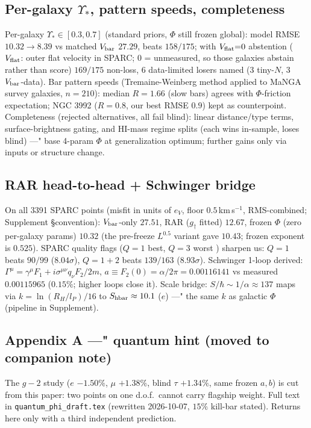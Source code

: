 \documentclass[twocolumn]{aastex631}
\begin{document}
\subsection{Per-galaxy $\Upsilon_{*}$, pattern speeds, completeness}
Per-galaxy $\Upsilon_{*}\in[0.3,0.7]$ (standard priors, $\Phi$ still frozen global): model RMSE $10.32\to\mathbf{8.39}$ vs matched $V_{\rm bar}$ $27.29$, beats $158/175$; with $V_{\rm flat}{=}0$ abstention ($V_{\rm flat}$: outer flat velocity in SPARC; $0$ = unmeasured, so those galaxies abstain rather than score) $169/175$ non-loss, 6 data-limited losers named (3 tiny-$N$, 3 $V_{\rm bar}$-data). Bar pattern speeds (Tremaine-Weinberg method applied to MaNGA survey galaxies, $n=210$): median $R=1.66$ (slow bars) agrees with $\Phi$-friction expectation; NGC 3992 ($R=0.8$, our best RMSE $0.9$) kept as counterpoint. Completeness (rejected alternatives, all fail blind): linear distance/type terms, surface-brightness gating, and HI-mass regime splits (each wins in-sample, loses blind) ---" base 4-param $\Phi$ at generalization optimum; further gains only via inputs or structure change.

\subsection{RAR head-to-head + Schwinger bridge}
On all 3391 SPARC points (misfit in units of $e_{V}$, floor $0.5$\,km\,s$^{-1}$, RMS-combined; Supplement \S convention): $V_{\rm bar}$-only $27.51$, RAR ($g_{\dagger}$ fitted) $12.67$, frozen $\Phi$ (zero per-galaxy params) $\mathbf{10.32}$ (the pre-freeze $L^{0.5}$ variant gave $10.43$; frozen exponent is $0.525$). SPARC quality flags ($Q{=}1$ best, $Q{=}3$ worst \cite{SPARC}) sharpen us: $Q{=}1$ beats $90/99$ ($8.04\sigma$), $Q{=}1{+}2$ beats $139/163$ ($8.93\sigma$). Schwinger 1-loop \cite{Schwinger1948} derived: $\Gamma^{\mu}=\gamma^{\mu}F_{1}+i\sigma^{\mu\nu}q_{\nu}F_{2}/2m$, $a\equiv F_{2}(0)=\alpha/2\pi=0.00116141$ vs measured $0.00115965$ ($0.15\%$; higher loops close it). Scale bridge: $S/\hbar\sim1/\alpha\approx137$ maps via $k=\ln(R_{H}/l_{P})/16$ to $S_{\rm hbar}\approx10.1$ ($e$) ---" the same $k$ as galactic $\Phi$ (pipeline in Supplement).

\subsection{Appendix A ---" quantum hint (moved to companion note)}
The $g-2$ study ($e$ $-1.50\%$, $\mu$ $+1.38\%$, blind $\tau$ $+1.34\%$, same frozen $a,b$) is cut from this paper: two points on one d.o.f.\ cannot carry flagship weight. Full text in {\tt quantum\_phi\_draft.tex} (rewritten 2026-10-07, $15\%$ kill-bar stated). Returns here only with a third independent prediction.
\end{document}
